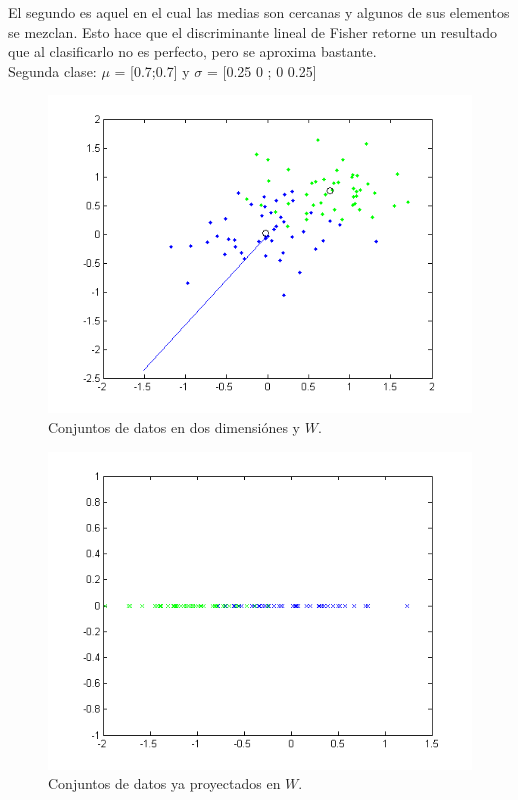 El segundo es aquel en el cual las medias son cercanas y algunos de sus elementos se mezclan. Esto hace que el discriminante lineal de Fisher retorne un resultado que al clasificarlo no es perfecto, pero se aproxima bastante.\\
Segunda clase: $\mu$ = [0.7;0.7] y $\sigma$ = [0.25 0 ; 0 0.25]

\begin{figure}[ht!]
\centering
\includegraphics[width=120mm]{img/tp4/ej4-3.png}
\caption{Conjuntos de datos en dos dimensiónes y $W$.}
\end{figure}

\begin{figure}[ht!]
\centering
\includegraphics[width=120mm]{img/tp4/ej4-4.png}
\caption{Conjuntos de datos ya proyectados en $W$.}
\end{figure}

